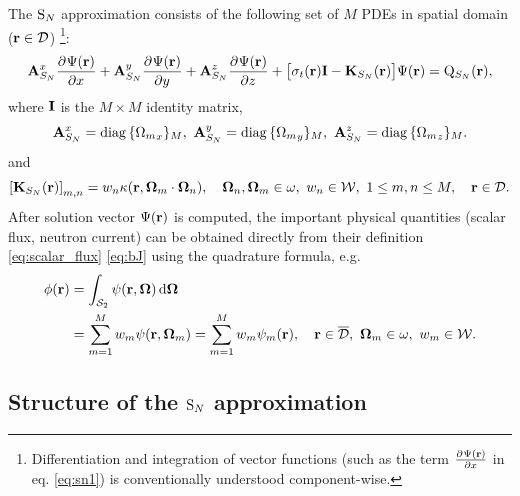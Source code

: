 The $\text{S}_{N}$ approximation consists of the
following set of $M$ PDEs in spatial domain ($\mathbf{r}\in\mathcal{D}$) \footnote{Differentiation and integration of vector functions
(such as the term $\frac{\partial^{}\Psi(\mathbf{r})}{\partial x^{}}$ in eq. \eqref{eq:sn1}) is conventionally understood component-wise.}:
\begin{equation}\label{eq:sn1} 
\mathbf{A}_{S_N}^x\frac{\partial^{}\Psi(\mathbf{r})}{\partial x^{}} + \mathbf{A}_{S_N}^y\frac{\partial^{}\Psi(\mathbf{r})}{\partial y^{}} +
\mathbf{A}_{S_N}^z\frac{\partial^{}\Psi(\mathbf{r})}{\partial z^{}} + \bigl[\sigma_t(\mathbf{r})\mathbf{I} - \mathbf{K}_{S_N}(\mathbf{r})\bigr]\Psi(\mathbf{r}) = \mathrm{Q}_{S_N}(\mathbf{r}),
\end{equation}
where $\mathbf{I}$ is the $M\times M$ identity matrix,
$$
	\mathbf{A}_{S_N}^x = \operatorname{diag\,}\{{\Omega_{m}}_x\}_{M},\ \mathbf{A}_{S_N}^y = \operatorname{diag\,}\{{\Omega_{m}}_y\}_{M},\
	\mathbf{A}_{S_N}^z = \operatorname{diag\,}\{{\Omega_{m}}_z\}_{M}.
$$
and
\begin{equation}\label{eq:SNK}
	\left[\mathbf{K}_{S_N}(\mathbf{r})\right]_{m,n} = w_n \kappa(\mathbf{r},\mathbf{\Omega}_m\cdot\mathbf{\Omega}_n),\quad
	\mathbf{\Omega}_n,\mathbf{\Omega}_m\in \omega,\ w_n\in \mathcal{W},\ 1 \leq m,n \leq M,\quad \mathbf{r}\in\mathcal{D}.
\end{equation}
After solution vector $\Psi(\mathbf{r})$ is computed, the
important physical quantities (scalar flux, neutron current) can be obtained directly from their definition \eqref{eq:scalar_flux}
\eqref{eq:bJ} using the quadrature formula, e.g.
\begin{equation}\label{eq:scalar_flux_sn}
\begin{aligned}
	\phi(\mathbf{r}) &= \int_{\mathcal{S}_2}\psi(\mathbf{r},\mathbf{\Omega})\,\text{d}\mathbf{\Omega}\,\\
	 &= \sum_{m=1}^{M} w_m \psi(\mathbf{r},\mathbf{\Omega}_m) = \sum_{m=1}^{M} w_m \psi_m(\mathbf{r}), \quad
	\mathbf{r}\in \overline{\mathcal{D}},\ \mathbf{\Omega}_m\in \omega,\ w_m\in \mathcal{W}.
\end{aligned}
\end{equation}



\subsection{Structure of the $\text{S}_{N}$ approximation}
